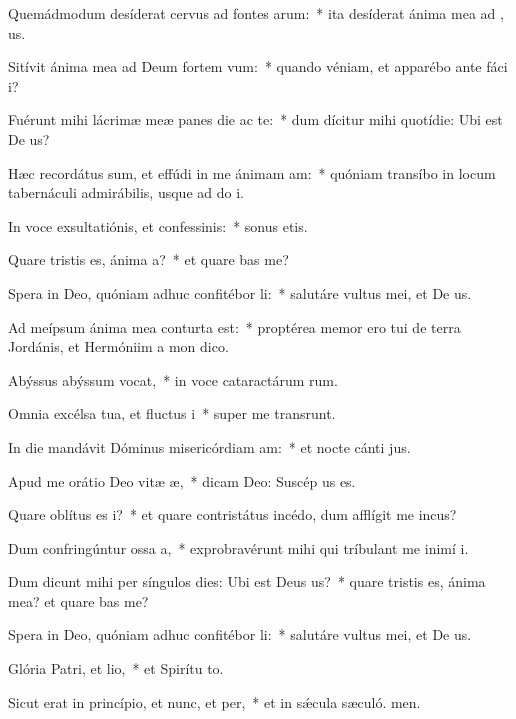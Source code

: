 \item Quemádmodum desíderat cervus ad fontes arum:~* ita desíderat ánima mea ad , us.
\item Sitívit ánima mea ad Deum fortem vum:~* quando véniam, et apparébo ante fáci i?
\item Fuérunt mihi lácrimæ meæ panes die ac te:~* dum dícitur mihi quotídie: Ubi est De us?
\item Hæc recordátus sum, et effúdi in me ánimam am:~* quóniam transíbo in locum tabernáculi admirábilis, usque ad do i.
\item In voce exsultatiónis, et confessinis:~* sonus etis.
\item Quare tristis es, ánima a?~* et quare bas me?
\item Spera in Deo, quóniam adhuc confitébor li:~* salutáre vultus mei, et De us.
\item Ad meípsum ánima mea conturta est:~* proptérea memor ero tui de terra Jordánis, et Hermóniim a mon dico.
\item Abýssus abýssum vocat,~* in voce cataractárum rum.
\item Omnia excélsa tua, et fluctus i~* super me transrunt.
\item In die mandávit Dóminus misericórdiam am:~* et nocte cánti jus.
\item Apud me orátio Deo vitæ æ,~* dicam Deo: Suscép us es.
\item Quare oblítus es i?~* et quare contristátus incédo, dum afflígit me incus?
\item Dum confringúntur ossa a,~* exprobravérunt mihi qui tríbulant me inimí i.
\item Dum dicunt mihi per síngulos dies: Ubi est Deus us?~* quare tristis es, ánima mea? et quare bas me?
\item Spera in Deo, quóniam adhuc confitébor li:~* salutáre vultus mei, et De us.
\item Glória Patri, et lio,~* et Spirítu to.
\item Sicut erat in princípio, et nunc, et per,~* et in sǽcula sæculó. men.
